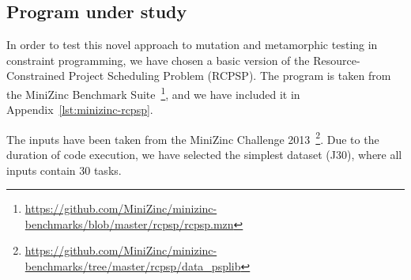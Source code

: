\subsection{Program under study}
In order to test this novel approach to mutation and metamorphic
testing in constraint programming, we have chosen a basic version of
the Resource-Constrained Project Scheduling Problem (RCPSP). The
program is taken from the MiniZinc Benchmark
Suite~\footnote{\url{https://github.com/MiniZinc/minizinc-benchmarks/blob/master/rcpsp/rcpsp.mzn}},
and we have included it in Appendix~\ref{lst:minizinc-rcpsp}.

The inputs have been taken from the MiniZinc Challenge
2013~\footnote{\url{https://github.com/MiniZinc/minizinc-benchmarks/tree/master/rcpsp/data_psplib}}. Due
to the duration of code execution, we have selected the simplest
dataset (J30), where all inputs contain 30 tasks.

